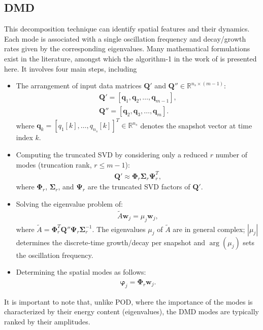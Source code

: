 \documentclass[a4paper,fleqn]{cas-sc}
\begin{document}
	\subsection{DMD}
	\label{DMD}
	
	This decomposition technique can identify spatial features and their dynamics. Each mode is associated with a single oscillation frequency and decay/growth rates given by the corresponding eigenvalues. Many mathematical formulations exist in the literature, amongst which the algorithm-1 in the work of \citet{H.Tu2014} is presented here. It involves four main steps, including
	\begin{itemize}
		\item[1.] The arrangement of input data matrices $\mathbf{Q}'$ and $\mathbf{Q}''\in \mathbb{R}^{n_{s}\times (m-1)}$:
		\begin{subequations}\label{eq 6}
			\begin{align}
				\mathbf{Q}' = [\mathbf{q}_1,\mathbf{q}_2,\ldots,\mathbf{q}_{m-1}], \label{eq 6a} \\
				\mathbf{Q}'' = [\mathbf{q}_2,\mathbf{q}_3,\ldots,\mathbf{q}_{m}].\label{eq 6b}
			\end{align}
		\end{subequations}
		where $\mathbf{q}_k=[q_1[k],\ldots,q_{n_s}[k]]^T\in\mathbb{R}^{n_s}$ denotes the snapshot vector at time index $k$.
		\item[2.] Computing the truncated SVD by considering only a reduced $r$ number of modes (truncation rank, $r\le m-1$):
		\begin{align}
			\mathbf{Q}' \approx \mathbf{\Phi}_r\mathbf{\Sigma} _r \mathbf{\Psi}_r^T, \label{eq 7}
		\end{align}
		where $\mathbf{\Phi}_r$, $\mathbf{\Sigma}_r$, and $\mathbf{\Psi}_r$ are the truncated SVD factors of $\mathbf{Q}'$.
		\item[3.] Solving the eigenvalue problem of:
		\begin{align}
			\tilde{A} \mathbf{w}_j = \mu_j \mathbf{w}_j, \label{eq 8}
		\end{align}
		where $\tilde{A}=\mathbf{\Phi}_r^T \mathbf{Q}'' \mathbf{\Psi}_r \mathbf{\Sigma}_r^{-1}$. The eigenvalues $\mu_j$ of $\tilde{A}$ are in general complex; $|\mu_j|$ determines the discrete-time growth/decay per snapshot and $\arg(\mu_j)$ sets the oscillation frequency.
		
		\item[4.] Determining the spatial modes as follows:
		\begin{align}
			\boldsymbol{\varphi} _j = \mathbf{\Phi}_r\mathbf{w}_j. \label{eq 9}
		\end{align}
		
	\end{itemize}
	It is important to note that, unlike POD, where the importance of the modes is characterized by their energy content (eigenvalues), the DMD modes are typically ranked by their amplitudes. 
	
\end{document}
